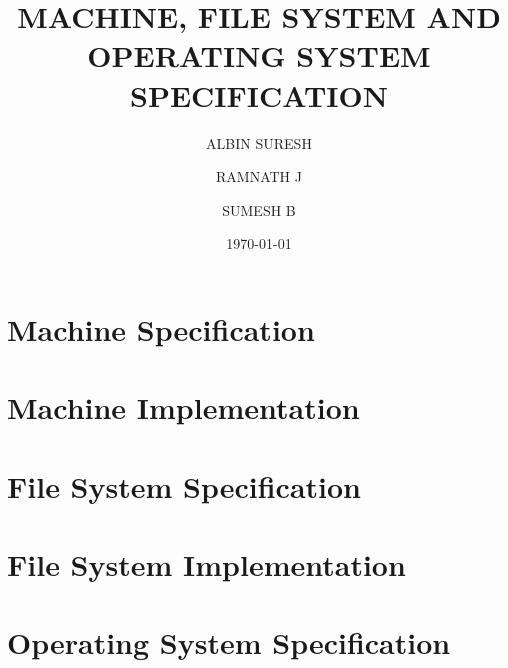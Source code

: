 \documentclass[a4paper,11pt]{report}
\begin{document}
\renewcommand*\listfigurename{Figures}

\title{\textbf{MACHINE, FILE SYSTEM AND OPERATING SYSTEM SPECIFICATION}}
\author{ALBIN SURESH \and RAMNATH J \and SUMESH B}
\date{\today}

\maketitle

%
%
%
%
%

\tableofcontents
\listoffigures


\part{Machine Specification}







\part{Machine Implementation}


\part{File System Specification}


\part{File System Implementation}


\part{Operating System Specification}










%
%

\clearpage
{}
\printindex

\clearpage
{}
{}


\end{document}
